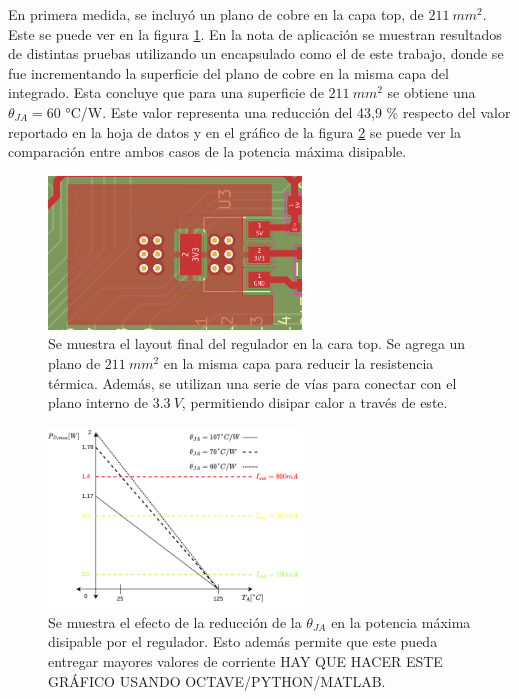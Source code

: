 En primera medida, se incluyó un plano de cobre en la capa top, de $211 \ mm^2$. Este se puede ver en la figura \ref{fig:plano_cobre_top_ldo}. En la nota de aplicación \cite{AN1028_thermal} se muestran resultados de distintas pruebas utilizando un encapsulado como el de este trabajo, donde se fue incrementando la superficie del plano de cobre en la misma capa del integrado. Esta concluye que para una superficie de $211 \ mm^2$ se obtiene una $\theta_{JA} = 60$ °C/W. Este valor representa una reducción del 43,9 \% respecto del valor reportado en la hoja de datos y en el gráfico de la figura \ref{fig:ldo_potencia_disipable} se puede ver la comparación entre ambos casos de la potencia máxima disipable.

\begin{figure}[H]
    \centering
    \includegraphics[width=0.6\textwidth]{img/plano_cobre_top_ldo.png}
    \caption{Se muestra el layout final del regulador en la cara top. Se agrega un plano de $211 \ mm^2$ en la misma capa para reducir la resistencia térmica. Además, se utilizan una serie de vías para conectar con el plano interno de $3.3 \ V$, permitiendo disipar calor a través de este.}
    \label{fig:plano_cobre_top_ldo}
\end{figure}

\begin{figure}[H]
    \centering
    \includegraphics[width=0.6\textwidth]{img/ldo_potencia_disipable.png}
    \caption{Se muestra el efecto de la reducción de la $\theta_{JA}$ en la potencia máxima disipable por el regulador. Esto además permite que este pueda entregar mayores valores de corriente {\color{red} HAY QUE HACER ESTE GRÁFICO USANDO OCTAVE/PYTHON/MATLAB}.}
    \label{fig:ldo_potencia_disipable}
\end{figure}


